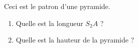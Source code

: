 
\begin{mental}
    Ceci est le patron d'une pyramide.

\begin{center}
   
\end{center}                                                                                                                                                 

\begin{enumerate}
    \item
        Quelle est la longueur \( S_2A\) ?
    \item
        Quelle est la hauteur de la pyramide ?
\end{enumerate}

\end{mental}
